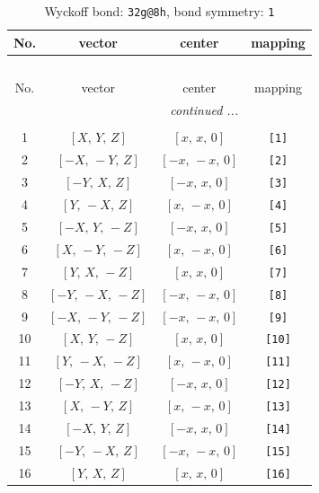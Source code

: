 \documentclass[fleqn,8pt]{jsarticle}
\begin{document}
\begin{longtable}{cccc}
\caption{Wyckoff bond: {\tt 32g@8h}, bond symmetry: {\tt 1}}
 \\
 \hline \hline
No. & vector & center & mapping \\ \hline \endfirsthead

\multicolumn{3}{l}{\tablename\ \thetable{}} \\
 \hline \hline
No. & vector & center & mapping \\ \hline \endhead

 \hline \hline
\multicolumn{3}{r}{\footnotesize\it continued ...} \\ \endfoot

 \hline \hline
\multicolumn{3}{r}{} \\ \endlastfoot

1 & $\left[ X,\, Y,\, Z \right]$ & $\left[ x,\, x,\, 0 \right]$ & {\tt [1]} \\ \hline
2 & $\left[ - X,\, - Y,\, Z \right]$ & $\left[ - x,\, - x,\, 0 \right]$ & {\tt [2]} \\ \hline
3 & $\left[ - Y,\, X,\, Z \right]$ & $\left[ - x,\, x,\, 0 \right]$ & {\tt [3]} \\ \hline
4 & $\left[ Y,\, - X,\, Z \right]$ & $\left[ x,\, - x,\, 0 \right]$ & {\tt [4]} \\ \hline
5 & $\left[ - X,\, Y,\, - Z \right]$ & $\left[ - x,\, x,\, 0 \right]$ & {\tt [5]} \\ \hline
6 & $\left[ X,\, - Y,\, - Z \right]$ & $\left[ x,\, - x,\, 0 \right]$ & {\tt [6]} \\ \hline
7 & $\left[ Y,\, X,\, - Z \right]$ & $\left[ x,\, x,\, 0 \right]$ & {\tt [7]} \\ \hline
8 & $\left[ - Y,\, - X,\, - Z \right]$ & $\left[ - x,\, - x,\, 0 \right]$ & {\tt [8]} \\ \hline
9 & $\left[ - X,\, - Y,\, - Z \right]$ & $\left[ - x,\, - x,\, 0 \right]$ & {\tt [9]} \\ \hline
10 & $\left[ X,\, Y,\, - Z \right]$ & $\left[ x,\, x,\, 0 \right]$ & {\tt [10]} \\ \hline
11 & $\left[ Y,\, - X,\, - Z \right]$ & $\left[ x,\, - x,\, 0 \right]$ & {\tt [11]} \\ \hline
12 & $\left[ - Y,\, X,\, - Z \right]$ & $\left[ - x,\, x,\, 0 \right]$ & {\tt [12]} \\ \hline
13 & $\left[ X,\, - Y,\, Z \right]$ & $\left[ x,\, - x,\, 0 \right]$ & {\tt [13]} \\ \hline
14 & $\left[ - X,\, Y,\, Z \right]$ & $\left[ - x,\, x,\, 0 \right]$ & {\tt [14]} \\ \hline
15 & $\left[ - Y,\, - X,\, Z \right]$ & $\left[ - x,\, - x,\, 0 \right]$ & {\tt [15]} \\ \hline
16 & $\left[ Y,\, X,\, Z \right]$ & $\left[ x,\, x,\, 0 \right]$ & {\tt [16]} \\
\end{longtable}
\end{document}
